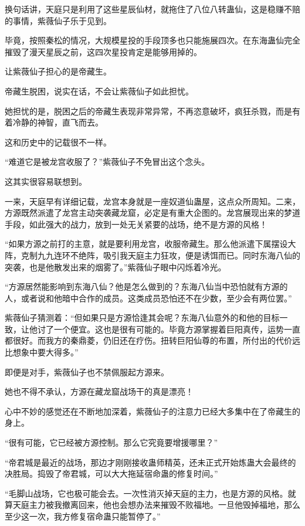 \begin{this_body}
换句话讲，天庭只是利用了这些星辰仙材，就拖住了八位八转蛊仙，这是稳赚不赔的事情，紫薇仙子乐于见到。

毕竟，按照秦松的情况，大规模星投的手段顶多也只能施展四次。在东海蛊仙完全摧毁了漫天星辰之前，这四次星投肯定是能够用掉的。

让紫薇仙子担心的是帝藏生。

帝藏生脱困，说实在话，不会让紫薇仙子如此担忧。

她担忧的是，脱困之后的帝藏生表现非常异常，不再恣意破坏，疯狂杀戮，而是有着冷静的神智，直飞而去。

这和历史中的记载很不一样。

“难道它是被龙宫收服了？”紫薇仙子不免冒出这个念头。

这其实很容易联想到。

一来，天庭早有详细记载，龙宫本身就是一座奴道仙蛊屋，这点众所周知。二来，方源既然派遣了龙宫主动突袭藏龙窟，必定是有重大企图的。龙宫展现出来的梦道手段，如此强大的战力，放到一处无关紧要的战场，绝不是方源的风格！

“如果方源之前打的主意，就是要利用龙宫，收服帝藏生。那么他派遣下属摆设大阵，克制九九连环不绝阵，吸引我天庭主力狂攻，便是诱饵而已。同时东海八仙的突袭，也是他散发出来的烟雾了。”紫薇仙子眼中闪烁着冷光。

“方源居然能影响到东海八仙？他是怎么做到的？东海八仙当中恐怕就有方源的人，或者说和他暗中合作的成员。这类成员恐怕还不在少数，至少会有两位罢。”

紫薇仙子猜测着：“但如果只是方源恰逢其会呢？东海八仙意外的和他的目标一致，让他讨了一个便宜。这也是很有可能的。毕竟方源掌握着巨阳真传，运势一直都很好。而我方的秦鼎菱，仍旧还在疗伤。扭转巨阳仙尊的布置，所付出的代价远比想象中要大得多。”

即便是对手，紫薇仙子也不禁佩服起方源来。

她也不得不承认，方源在藏龙窟战场干的真是漂亮！

心中不妙的感觉还在不断地加深着，紫薇仙子的注意力已经大多集中在了帝藏生的身上。

“很有可能，它已经被方源控制。那么它究竟要增援哪里？”

“帝君城是最近的战场，那边才刚刚接收蛊师精英，还未正式开始炼蛊大会最终的决胜局。捣毁了帝君城，可以大大拖延宿命蛊的修复时间。”

“毛脚山战场，它也极可能会去。一次性消灭掉天庭的主力，也是方源的风格。就算天庭主力被我撤离回来，他也会想办法来摧毁不败福地。一旦他毁掉福地，那么至少这一次，我方修复宿命蛊只能暂停了。”


\end{this_body}
